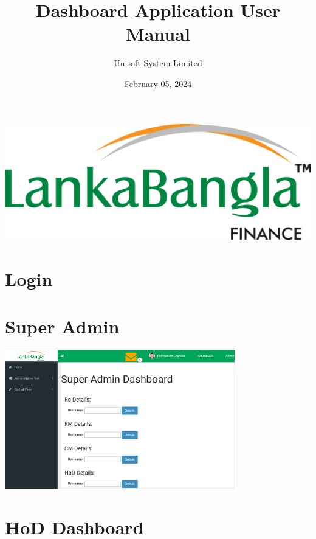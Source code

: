 \documentclass{article}
\begin{document}
\begin{center}
\includegraphics[width=1.0\textwidth]{image/logo_lbfl.png}
\title{Dashboard Application User Manual}
\author{Unisoft System Limited}
\date{February 05, 2024}
\end{center}

\maketitle



\newpage

\tableofcontents

\newpage

\section{Login}
\lipsum[1-2] %


\section{Super Admin}
\begin{center}
\includegraphics[width=0.75\textwidth]{image/super_admin.png}
\end{center}


\section{HoD Dashboard}
\lipsum[3-4] %
\end{document}
